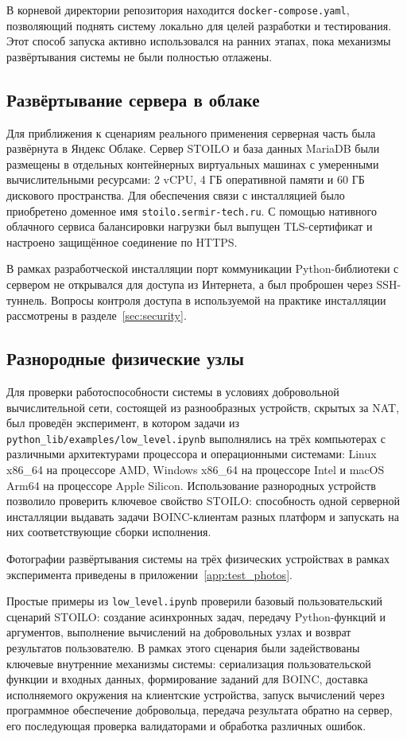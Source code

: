\documentclass[a4paper,12pt]{extarticle}
\begin{document}
В корневой директории репозитория находится \texttt{docker-compose.yaml}, позволяющий поднять систему локально для целей разработки и тестирования.
Этот способ запуска активно использовался на ранних этапах, пока механизмы развёртывания системы не были полностью отлажены.

\subsection{Развёртывание сервера в облаке}

Для приближения к сценариям реального применения серверная часть была развёрнута в Яндекс Облаке.
Сервер STOILO и база данных MariaDB были размещены в отдельных контейнерных виртуальных машинах с умеренными вычислительными ресурсами: 2 vCPU, 4 ГБ оперативной памяти и 60 ГБ дискового пространства.
Для обеспечения связи с инсталляцией было приобретено доменное имя \texttt{stoilo.sermir-tech.ru}.
С помощью нативного облачного сервиса балансировки нагрузки был выпущен TLS-сертификат и настроено защищённое соединение по HTTPS.

В рамках разработческой инсталляции порт коммуникации Python-библиотеки с сервером не открывался для доступа из Интернета, а был проброшен через SSH-туннель.
Вопросы контроля доступа в используемой на практике инсталляции рассмотрены в разделе~\ref{sec:security}.

\subsection{Разнородные физические узлы}

Для проверки работоспособности системы в условиях добровольной вычислительной сети, состоящей из разнообразных устройств, скрытых за NAT, был проведён эксперимент, в котором
задачи из \texttt{python\_lib/examples/low\_level.ipynb} выполнялись на трёх компьютерах с различными архитектурами процессора и операционными системами: Linux x86\_64 на процессоре AMD, Windows x86\_64 на процессоре Intel и macOS Arm64 на процессоре Apple Silicon.
Использование разнородных устройств позволило проверить ключевое свойство STOILO: способность одной серверной инсталляции выдавать задачи BOINC-клиентам разных платформ и запускать на них соответствующие сборки исполнения.

Фотографии развёртывания системы на трёх физических устройствах в рамках эксперимента приведены в приложении~\ref{app:test_photos}.

Простые примеры из \texttt{low\_level.ipynb} проверили базовый пользовательский сценарий STOILO: создание асинхронных задач, передачу Python-функций и аргументов, выполнение вычислений на добровольных узлах и возврат результатов пользователю.
В рамках этого сценария были задействованы ключевые внутренние механизмы системы: сериализация пользовательской функции и входных данных, формирование заданий для BOINC, доставка исполняемого окружения на клиентские устройства, запуск вычислений через программное обеспечение добровольца, передача результата обратно на сервер, его последующая проверка валидаторами и обработка различных ошибок.
\end{document}
